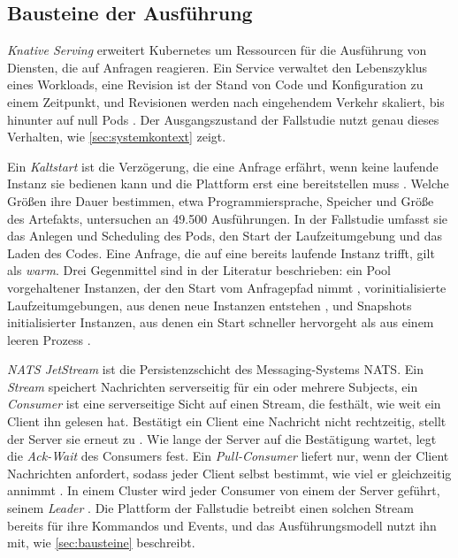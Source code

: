 \subsection{Bausteine der Ausführung}
\label{sec:grundlagen:bausteine}

\emph{Knative Serving} erweitert Kubernetes um Ressourcen für die Ausführung von Diensten, die auf
Anfragen reagieren. Ein Service verwaltet den Lebenszyklus eines Workloads, eine Revision ist der
Stand von Code und Konfiguration zu einem Zeitpunkt, und Revisionen werden nach eingehendem
Verkehr skaliert, bis hinunter auf null Pods \autocite{the_knative_authors_overview_2026}. Der Ausgangszustand der Fallstudie nutzt genau
dieses Verhalten, wie \autoref{sec:systemkontext} zeigt.

Ein \emph{Kaltstart} ist die Verzögerung, die eine Anfrage erfährt, wenn keine laufende Instanz sie
bedienen kann und die Plattform erst eine bereitstellen muss
\autocite[S.~1]{lin_mitigating_2019}. Welche Größen ihre Dauer bestimmen, etwa Programmiersprache, Speicher und
Größe des Artefakts, untersuchen \textcite[S.~181]{manner_cold_2018} an 49.500 Ausführungen. In der Fallstudie umfasst sie das Anlegen und Scheduling des
Pods, den Start der Laufzeitumgebung und das Laden des Codes. Eine Anfrage, die auf eine bereits
laufende Instanz trifft, gilt als \emph{warm}. Drei Gegenmittel sind in der Literatur
beschrieben: ein Pool vorgehaltener Instanzen, der den Start vom Anfragepfad nimmt
\autocite[S.~1]{lin_mitigating_2019}, vorinitialisierte Laufzeitumgebungen, aus denen neue Instanzen
entstehen \autocite[S.~57, 63]{oakes_sock_2018}, und Snapshots initialisierter Instanzen, aus denen ein Start
schneller hervorgeht als aus einem leeren Prozess \autocite[S.~559]{ustiugov_benchmarking_2021}.

\emph{NATS JetStream} ist die Persistenzschicht des Messaging-Systems NATS. Ein \emph{Stream}
speichert Nachrichten serverseitig für ein oder mehrere Subjects, ein \emph{Consumer} ist eine
serverseitige Sicht auf einen Stream, die festhält, wie weit ein Client ihn gelesen hat. Bestätigt
ein Client eine Nachricht nicht rechtzeitig, stellt der Server sie erneut zu
\autocite{the_nats_authors_jetstream_2026}. Wie lange der Server auf die Bestätigung wartet, legt die \emph{Ack-Wait}
des Consumers fest. Ein \emph{Pull-Consumer} liefert nur, wenn der Client Nachrichten anfordert, sodass jeder Client
selbst bestimmt, wie viel er gleichzeitig annimmt \autocite{the_nats_authors_consumers_2026}. In einem Cluster wird
jeder Consumer von einem der Server geführt, seinem \emph{Leader} \autocite{the_nats_authors_clustering_2026}. Die Plattform der Fallstudie betreibt einen solchen
Stream bereits für ihre Kommandos und Events, und das Ausführungsmodell nutzt ihn mit, wie
\autoref{sec:bausteine} beschreibt.

